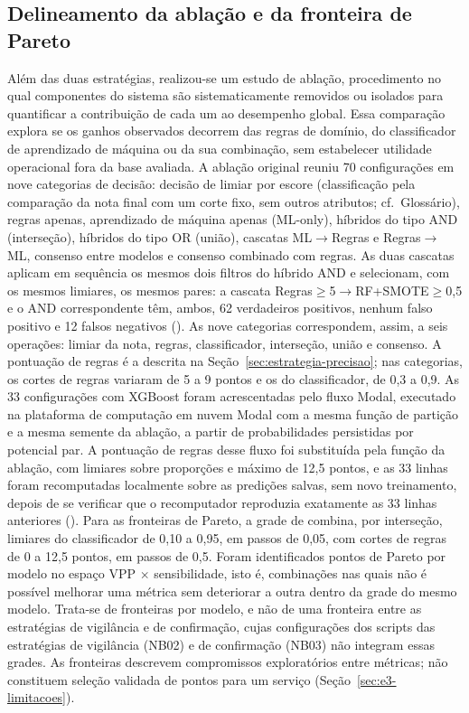 \subsection{Delineamento da ablação e da fronteira de Pareto}\label{sec:e3-ablacao-metodo}

Além das duas estratégias, realizou-se um estudo de ablação, procedimento no qual componentes do sistema são sistematicamente removidos ou isolados para quantificar a contribuição de cada um ao desempenho global. Essa comparação explora se os ganhos observados decorrem das regras de domínio, do classificador de aprendizado de máquina ou da sua combinação, sem estabelecer utilidade operacional fora da base avaliada. A ablação original reuniu 70 configurações em nove categorias de decisão: decisão de limiar por escore (classificação pela comparação da nota final com um corte fixo, sem outros atributos; cf.\ Glossário), regras apenas, aprendizado de máquina apenas (ML-only), híbridos do tipo AND (interseção), híbridos do tipo OR (união), cascatas ML$\rightarrow$Regras e Regras$\rightarrow$ML, consenso entre modelos e consenso combinado com regras. As duas cascatas aplicam em sequência os mesmos dois filtros do híbrido AND e selecionam, com os mesmos limiares, os mesmos pares: a cascata Regras$\geq$5$\rightarrow$RF+SMOTE$\geq$0,5 e o AND correspondente têm, ambos, 62 verdadeiros positivos, nenhum falso positivo e 12 falsos negativos (). As nove categorias correspondem, assim, a seis operações: limiar da nota, regras, classificador, interseção, união e consenso. A pontuação de regras é a descrita na Seção~\ref{sec:estrategia-precisao}; nas categorias, os cortes de regras variaram de 5 a 9 pontos e os do classificador, de 0,3 a 0,9. As 33 configurações com XGBoost foram acrescentadas pelo fluxo Modal, executado na plataforma de computação em nuvem Modal com a mesma função de partição e a mesma semente da ablação, a partir de probabilidades persistidas por potencial par. A pontuação de regras desse fluxo foi substituída pela função da ablação, com limiares sobre proporções e máximo de 12,5 pontos, e as 33 linhas foram recomputadas localmente sobre as predições salvas, sem novo treinamento, depois de se verificar que o recomputador reproduzia exatamente as 33 linhas anteriores (). Para as fronteiras de Pareto, a grade de  combina, por interseção, limiares do classificador de 0,10 a 0,95, em passos de 0,05, com cortes de regras de 0 a 12,5 pontos, em passos de 0,5. Foram identificados pontos de Pareto por modelo no espaço VPP $\times$ sensibilidade, isto é, combinações nas quais não é possível melhorar uma métrica sem deteriorar a outra dentro da grade do mesmo modelo. Trata-se de fronteiras por modelo, e não de uma fronteira entre as estratégias de vigilância e de confirmação, cujas configurações dos scripts das estratégias de vigilância (NB02) e de confirmação (NB03) não integram essas grades. As fronteiras descrevem compromissos exploratórios entre métricas; não constituem seleção validada de pontos para um serviço (Seção~\ref{sec:e3-limitacoes}).

